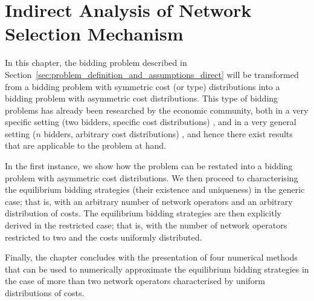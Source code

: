 \chapter{Indirect Analysis of Network Selection Mechanism}
\label{cha:indirect}

\minitoc
\vspace{10mm}

In this chapter, the bidding problem described in Section~\ref{sec:problem_definition_and_assumptions_direct} will be transformed from a bidding problem with symmetric cost (or type) distributions into a bidding problem with asymmetric cost distributions. This type of bidding problems has already been researched by the economic community, both in a very specific setting (two bidders, specific cost distributions) \cite{KaplanZamir2007,MaskinRiley2000}, and in a very general setting ($n$ bidders, arbitrary cost distributions) \cite{Lebrun1999,Lebrun2006}, and hence there exist results that are applicable to the problem at hand.

In the first instance, we show how the problem can be restated into a bidding problem with asymmetric cost distributions. We then proceed to characterising the equilibrium bidding strategies (their existence and uniqueness) in the generic case; that is, with an arbitrary number of network operators and an arbitrary distribution of costs. The equilibrium bidding strategies are then explicitly derived in the restricted case; that is, with the number of network operators restricted to two and the costs uniformly distributed.

Finally, the chapter concludes with the presentation of four numerical methods that can be used to numerically approximate the equilibrium bidding strategies in the case of more than two network operators characterised by uniform distributions of costs.

